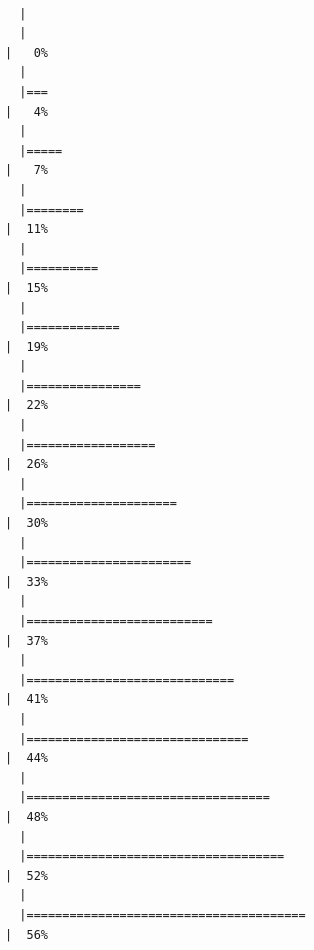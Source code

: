 \documentclass[
  letterpaper,
  DIV=11,
  numbers=noendperiod]{scrartcl}
\begin{document}
\begin{verbatim}

  |                                                                            
  |                                                                      |   0%
  |                                                                            
  |===                                                                   |   4%
  |                                                                            
  |=====                                                                 |   7%
  |                                                                            
  |========                                                              |  11%
  |                                                                            
  |==========                                                            |  15%
  |                                                                            
  |=============                                                         |  19%
  |                                                                            
  |================                                                      |  22%
  |                                                                            
  |==================                                                    |  26%
  |                                                                            
  |=====================                                                 |  30%
  |                                                                            
  |=======================                                               |  33%
  |                                                                            
  |==========================                                            |  37%
  |                                                                            
  |=============================                                         |  41%
  |                                                                            
  |===============================                                       |  44%
  |                                                                            
  |==================================                                    |  48%
  |                                                                            
  |====================================                                  |  52%
  |                                                                            
  |=======================================                               |  56%

\end{verbatim}
\end{document}
